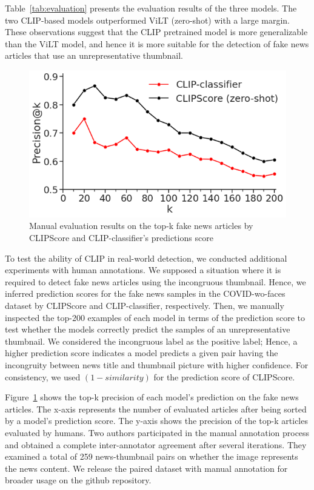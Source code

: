 \documentclass[11pt]{article}
\begin{document}
Table~\ref{tab:evaluation} presents the evaluation results of the three models. The two CLIP-based models outperformed ViLT (zero-shot) with a large margin. These observations suggest that the CLIP pretrained model is more generalizable than the ViLT model, and hence it is more suitable for the detection of fake news articles that use an unrepresentative thumbnail.

\begin{figure}[t]
    \centering
    \includegraphics[width=\linewidth]{fig/precision22.png}
    \caption{Manual evaluation results on the top-k fake news articles by CLIPScore and CLIP-classifier's predictions score}
    \label{fig:top100}
\end{figure}

To test the ability of CLIP in real-world detection, we conducted additional experiments with human annotations. We supposed a situation where it is required to detect fake news articles using the incongruous thumbnail. Hence, we inferred prediction scores for the fake news samples in the COVID-wo-faces dataset by CLIPScore and CLIP-classifier, respectively. Then, we manually inspected the top-200 examples of each model in terms of the prediction score to test whether the models correctly predict the samples of an unrepresentative thumbnail. We considered the incongruous label as the positive label; Hence, a higher prediction score indicates a model predicts a given pair having the incongruity between news title and thumbnail picture with higher confidence. For consistency, we used $(1-similarity)$ for the prediction score of CLIPScore.

Figure~\ref{fig:top100} shows the top-k precision of each model's prediction on the fake news articles. The x-axis represents the number of evaluated articles after being sorted by a model's prediction score. The y-axis shows the precision of the top-k articles evaluated by humans. Two authors participated in the manual annotation process and obtained a complete inter-annotator agreement after several iterations. They examined a total of 259 news-thumbnail pairs on whether the image represents the news content. We release the paired dataset with manual annotation for broader usage on the github repository.
\end{document}

